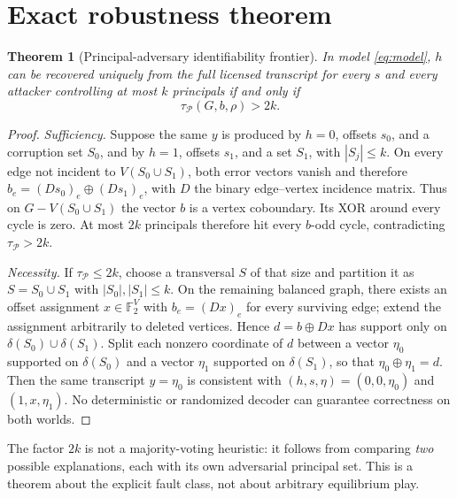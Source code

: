 \documentclass[10pt,a4paper]{article}
\newtheorem{theorem}{Theorem}
\theoremstyle{definition}\newtheorem{definition}[theorem]{Definition}
\newcommand{\F}{\mathbb F_2}
\newcommand{\Princ}{\mathcal P}
\newcommand{\xor}{\mathbin{\oplus}}
\begin{document}
\section{Exact robustness theorem}
\begin{theorem}[Principal-adversary identifiability frontier]\label{thm:robust}
In model \eqref{eq:model}, $h$ can be recovered uniquely from the full licensed transcript for every $s$ and every attacker controlling at most $k$ principals if and only if
\begin{equation}\boxed{\tau_{\Princ}(G,b,\rho)>2k.}\end{equation}
\end{theorem}
\begin{proof}
\emph{Sufficiency.} Suppose the same $y$ is produced by $h=0$, offsets $s_0$, and a corruption set $S_0$, and by $h=1$, offsets $s_1$, and a set $S_1$, with $|S_j|\le k$. On every edge not incident to $V(S_0\cup S_1)$, both error vectors vanish and therefore $b_e=(Ds_0)_e\xor(Ds_1)_e$, with $D$ the binary edge--vertex incidence matrix. Thus on $G-V(S_0\cup S_1)$ the vector $b$ is a vertex coboundary. Its XOR around every cycle is zero. At most $2k$ principals therefore hit every $b$-odd cycle, contradicting $\tau_{\Princ}>2k$.

\emph{Necessity.} If $\tau_{\Princ}\le2k$, choose a transversal $S$ of that size and partition it as $S=S_0\cup S_1$ with $|S_0|,|S_1|\le k$. On the remaining balanced graph, there exists an offset assignment $x\in\F^V$ with $b_e=(Dx)_e$ for every surviving edge; extend the assignment arbitrarily to deleted vertices. Hence $d=b\xor Dx$ has support only on $\delta(S_0)\cup\delta(S_1)$. Split each nonzero coordinate of $d$ between a vector $\eta_0$ supported on $\delta(S_0)$ and a vector $\eta_1$ supported on $\delta(S_1)$, so that $\eta_0\xor\eta_1=d$. Then the same transcript $y=\eta_0$ is consistent with $(h,s,\eta)=(0,0,\eta_0)$ and $(1,x,\eta_1)$. No deterministic or randomized decoder can guarantee correctness on both worlds.\end{proof}

The factor $2k$ is not a majority-voting heuristic: it follows from comparing \emph{two} possible explanations, each with its own adversarial principal set. This is a theorem about the explicit fault class, not about arbitrary equilibrium play.
\end{document}
